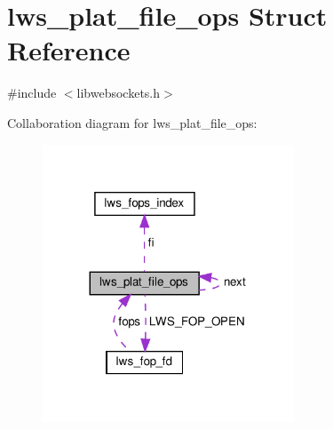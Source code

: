 \hypertarget{structlws__plat__file__ops}{}\section{lws\+\_\+plat\+\_\+file\+\_\+ops Struct Reference}
\label{structlws__plat__file__ops}


{\ttfamily \#include $<$libwebsockets.\+h$>$}



Collaboration diagram for lws\+\_\+plat\+\_\+file\+\_\+ops\+:
\nopagebreak
\begin{figure}[H]
\begin{center}
\leavevmode
\includegraphics[width=212pt]{structlws__plat__file__ops__coll__graph}
\end{center}
\end{figure}
